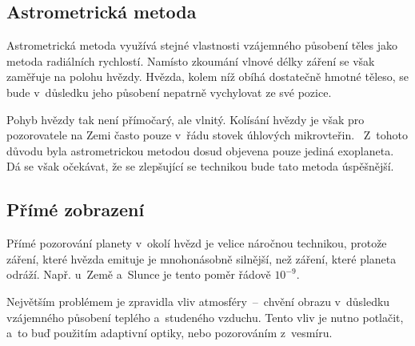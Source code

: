 \documentclass[a4paper,12pt]{article}
\begin{document}
{{{

\vspace{-10pt}

\subsection{Astrometrická metoda}


Astrometrická metoda využívá stejné vlastnosti vzájemného působení těles jako metoda radiálních rychlostí. Namísto zkoumání vlnové délky záření se však zaměřuje na polohu hvězdy. Hvězda, kolem níž obíhá dostatečně hmotné těleso, se bude v~důsledku jeho působení nepatrně vychylovat ze své pozice.~\cite{methods}

Pohyb hvězdy tak není přímočarý, ale vlnitý. Kolísání hvězdy je však pro pozorovatele na Zemi často pouze v~řádu stovek úhlových mikrovteřin.~\cite{methods} Z~tohoto důvodu byla astrometrickou metodou dosud objevena pouze jediná exoplaneta. Dá se však očekávat, že se zlepšující se technikou bude tato metoda úspěšnější.~\cite{nasadata}

\drawgimp[2]

\subsection{Přímé zobrazení}


Přímé pozorování planety v~okolí hvězd je velice náročnou technikou, protože záření, které hvězda emituje je mnohonásobně silnější, než záření, které planeta odráží. Např. u~Země a~Slunce je tento poměr řádově $10^{-9}$.~\cite{methods}

Největším problémem je zpravidla vliv atmosféry~--~chvění obrazu v~důsledku vzájemného působení teplého a~studeného vzduchu. Tento vliv je nutno potlačit, a~to buď použitím adaptivní optiky, nebo pozorováním z~vesmíru.~\cite{methods}


}}}
\end{document}
